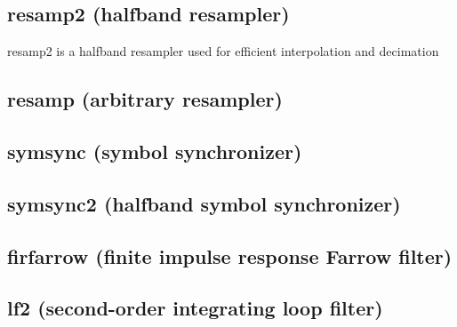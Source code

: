 \subsection{resamp2 (halfband resampler)}
resamp2 is a halfband resampler used for efficient interpolation and
decimation

\subsection{resamp (arbitrary resampler)}

\subsection{symsync (symbol synchronizer)}

\subsection{symsync2 (halfband symbol synchronizer)}

\subsection{firfarrow (finite impulse response Farrow filter)}

\subsection{lf2 (second-order integrating loop filter)}


